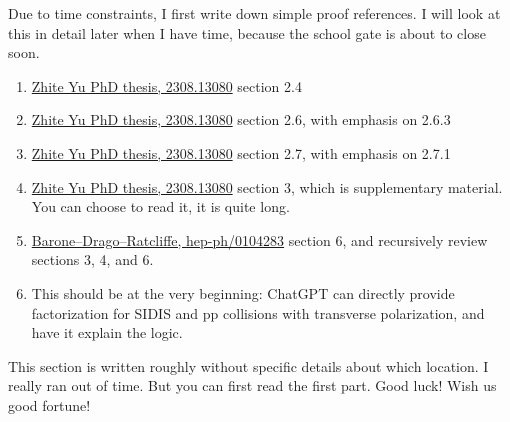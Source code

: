 \documentclass[12pt]{article}
\begin{document}
Due to time constraints, I first write down simple proof references. I will look at this in detail later when I have time, because the school gate is about to close soon.

\begin{enumerate}
    \item \href{http://arxiv.org/abs/2308.13080}{Zhite Yu PhD thesis, 2308.13080} section 2.4
    
    \item \href{http://arxiv.org/abs/2308.13080}{Zhite Yu PhD thesis, 2308.13080} section 2.6, with emphasis on 2.6.3
    
    \item \href{http://arxiv.org/abs/2308.13080}{Zhite Yu PhD thesis, 2308.13080} section 2.7, with emphasis on 2.7.1
    
    \item \href{http://arxiv.org/abs/2308.13080}{Zhite Yu PhD thesis, 2308.13080} section 3, which is supplementary material. You can choose to read it, it is quite long.
    
    \item \href{https://arxiv.org/abs/hep-ph/0104283}{Barone--Drago--Ratcliffe, hep-ph/0104283} section 6, and recursively review sections 3, 4, and 6.
    
    \item This should be at the very beginning: ChatGPT can directly provide factorization for SIDIS and pp collisions with transverse polarization, and have it explain the logic.
\end{enumerate}

This section is written roughly without specific details about which location. I really ran out of time. But you can first read the first part. Good luck! Wish us good fortune! 
\end{document}

